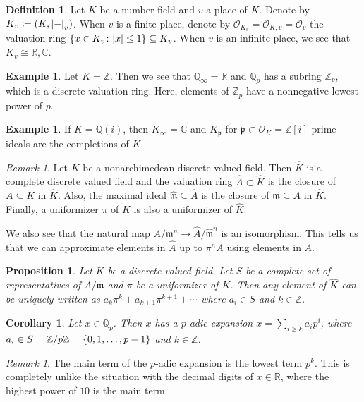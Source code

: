 \documentclass[leqno, openany]{memoir}
\newtheorem{cor}[thm]{Corollary}
\newtheorem{prop}[thm]{Proposition}
\theoremstyle{definition}
\newtheorem{defn}[thm]{Definition}
\newtheorem{exm}[thm]{Example}
\theoremstyle{remark}
\newtheorem{rmk}[thm]{Remark}
\theoremstyle{plain}
\theoremstyle{definition}
\theoremstyle{remark}
\newcommand{\R}{\mathbb{R}}
\newcommand{\C}{\mathbb{C}}
\newcommand{\Z}{\mathbb{Z}}
\newcommand{\Q}{\mathbb{Q}}
\newcommand{\mc}[1]{\mathcal{#1}}
\newcommand{\mf}[1]{\mathfrak{#1}}
\newcommand{\wh}[1]{\widehat{#1}}
\begin{document}
\begin{defn}
    Let $K$ be a number field and $v$ a place of $K$. Denote by $K_v \coloneqq (K, \abs{-}_v)$. When $v$ is a finite place, denote by $\mc{O}_{K_v} = \mc{O}_{K,v} = \mc{O}_v$ the valuation ring $\qty{x \in K_v \colon \abs{x} \leq 1} \subseteq K_v$. When $v$ is an infinite place, we see that $K_v \cong \R, \C$.
\end{defn}

\begin{exm}
    Let $K = \Z$. Then we see that $\Q_{\infty} = \R$ and $\Q_p$ has a subring $\Z_p$, which is a discrete valuation ring. Here, elements of $\Z_p$ have a nonnegative lowest power of $p$.
\end{exm}

\begin{exm}
    If $K = \Q(i)$, then $K_{\infty} = \C$ and $K_{\mf{p}}$ for $\mf{p} \subset \mc{O}_K = \Z[i]$ prime ideals are the completions of $K$.
\end{exm}

\begin{rmk}
    Let $K$ be a nonarchimedean discrete valued field. Then $\wh{K}$ is a complete discrete valued field and the valuation ring $\wh{A} \subset \wh{K}$ is the closure of $A \subseteq K$ in $\wh{K}$. Also, the maximal ideal $\wh{\mf{m}} \subseteq \wh{A}$ is the closure of $\mf{m} \subseteq A$ in $\wh{K}$. Finally, a uniformizer $\pi$ of $K$ is also a uniformizer of $\wh{K}$.

    We also see that the natural map $A / \mf{m}^n \to \wh{A} / \wh{\mf{m}}^n$ is an isomorphism. This tells us that we can approximate elements in $\wh{A}$ up to $\pi^n A$ using elements in $A$.
\end{rmk}

\begin{prop}
    Let $K$ be a discrete valued field. Let $S$ be a complete set of representatives of $A/\mf{m}$ and $\pi$ be a uniformizer of $K$. Then any element of $\wh{K}$ can be uniquely written as $a_k \pi^k + a_{k+1} \pi^{k+1} + \cdots$ where $a_i \in S$ and $k \in \Z$.
\end{prop}

\begin{cor}
    Let $x \in \Q_p$. Then $x$ has a \textit{$p$-adic expansion} $x = \sum_{i \geq k} a_i p^i$, where $a_i \in S = \Z/p\Z = \qty{0, 1, \ldots, p-1}$ and $k \in \Z$. 
\end{cor}

\begin{rmk}
    The main term of the $p$-adic expansion is the lowest term $p^k$. This is completely unlike the situation with the decimal digits of $x \in \R$, where the highest power of $10$ is the main term.
\end{rmk}
\end{document}
